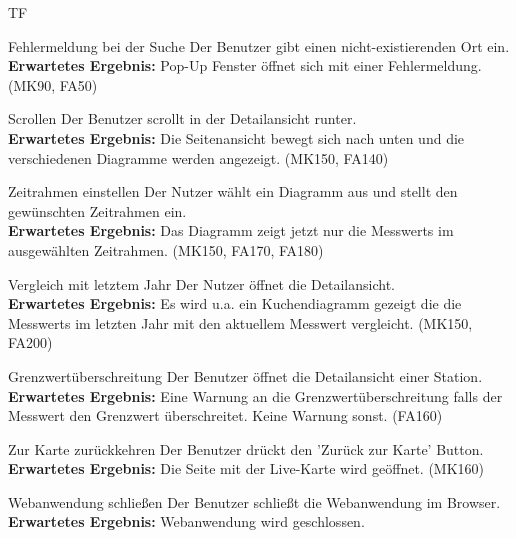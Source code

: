 \begin{Kriterien}{TF}
	\item[Fehlermeldung bei der Suche] Der Benutzer gibt einen nicht-existierenden Ort ein. \\ \textbf{Erwartetes Ergebnis:} Pop-Up Fenster öffnet sich mit einer Fehlermeldung. (MK90, FA50)
	
	\item[Scrollen] Der Benutzer scrollt in der Detailansicht runter. \\ \textbf{Erwartetes Ergebnis:} Die Seitenansicht bewegt sich nach unten und die verschiedenen Diagramme werden angezeigt. (MK150, FA140)
	
    
    \item[Zeitrahmen einstellen] Der Nutzer wählt ein Diagramm aus und stellt den gewünschten Zeitrahmen ein. \\ \textbf{Erwartetes Ergebnis:} Das Diagramm zeigt jetzt nur die \glspl{Messwert} im ausgewählten Zeitrahmen. (MK150, FA170, FA180)
    
    \item[Vergleich mit letztem Jahr] Der Nutzer öffnet die \gls{Detailansicht}. \\ \textbf{Erwartetes Ergebnis:} Es wird u.a. ein Kuchendiagramm gezeigt die die \glspl{Messwert} im letzten Jahr mit den aktuellem Messwert vergleicht. (MK150, FA200)
    
    \item[Grenzwertüberschreitung] Der Benutzer öffnet die \gls{Detailansicht} einer \gls{Station}. \\ \textbf{Erwartetes Ergebnis:} Eine Warnung an die Grenzwertüberschreitung falls der \gls{Messwert} den Grenzwert überschreitet. Keine Warnung sonst. (FA160)
	
	\item[Zur Karte zurückkehren] Der Benutzer drückt den 'Zurück zur Karte' Button. \\ \textbf{Erwartetes Ergebnis:} Die Seite mit der \gls{Live-Karte} wird geöffnet. (MK160)
	
	\item[Webanwendung schließen] Der Benutzer schließt die Webanwendung im Browser. \\ \textbf{Erwartetes Ergebnis:} Webanwendung wird geschlossen.
\end{Kriterien}
